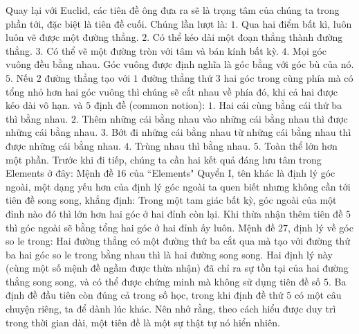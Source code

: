 \begin{multicols}{2}
	\vskip 0.1cm
	Quay lại với Euclid, các tiên đề ông đưa ra sẽ là trọng tâm của chúng ta trong phần tới, đặc biệt là tiên đề cuối. Chúng lần lượt là:
	\vskip 0.1cm
	$1.$ Qua hai điểm bất kì, luôn luôn vẽ được một đường thẳng.
	\vskip 0.1cm
	$2.$ Có thể kéo dài một đoạn thẳng thành đường thẳng.
	\vskip 0.1cm
	$3.$ Có thể vẽ một đường tròn với tâm và bán kính bất kỳ.
	\vskip 0.1cm
	$4.$ Mọi góc vuông đều bằng nhau.
	\vskip 0.1cm
	Góc vuông được định nghĩa là góc bằng với góc bù của nó.
	\vskip 0.1cm
	$5.$ Nếu $2$ đường thẳng tạo với $1$ đường thẳng thứ $3$ hai góc trong cùng phía mà có tổng nhỏ hơn hai góc vuông thì chúng sẽ cắt nhau về phía đó, khi cả hai được kéo dài vô hạn.
	\vskip 0.1cm
	và $5$ định đề (common notion):
	\vskip 0.1cm
	$1.$ Hai cái cùng bằng cái thứ ba thì bằng nhau. 
	\vskip 0.1cm
	$2.$ Thêm những cái bằng nhau vào những cái bằng nhau thì được những cái bằng nhau.
	\vskip 0.1cm
	$3.$ Bớt đi những cái bằng nhau từ những cái bằng nhau thì được những cái bằng nhau.
	\vskip 0.1cm
	$4.$ Trùng nhau thì bằng nhau.
	\vskip 0.1cm
	$5.$ Toàn thể lớn hơn một phần.
	\vskip 0.1cm
	Trước khi đi tiếp, chúng ta cần hai kết quả đáng lưu tâm trong Elements ở đây:
	\vskip 0.1cm
	Mệnh đề $16$ của ``Elements" Quyển I, tên khác là định lý góc ngoài, một dạng yếu hơn của định lý góc ngoài ta quen biết nhưng không cần tới tiên đề song song, khẳng định: 
	\vskip 0.1cm
	Trong một tam giác bất kỳ, góc ngoài của một đỉnh nào đó thì lớn hơn hai góc ở hai đỉnh còn lại.
	\vskip 0.1cm
	Khi thừa nhận thêm tiên đề $5$ thì góc ngoài sẽ bằng tổng hai góc ở hai đỉnh ấy luôn.
	\vskip 0.1cm
	Mệnh đề $27$, định lý về góc so le trong: 
	\vskip 0.1cm
	Hai đường thẳng có một đường thứ ba cắt qua mà tạo với đường thứ ba hai góc so le trong bằng nhau thì là hai đường song song.
	\vskip 0.1cm
	Hai định lý này (cùng một số mệnh đề ngầm được thừa nhận) đã chỉ ra sự tồn tại của hai đường thẳng song song, và có thể được chứng minh mà không sử dụng tiên đề số $5$. Ba định đề đầu tiên còn đúng cả trong số học, trong khi định đề thứ $5$ có một câu chuyện riêng, ta để dành lúc khác. Nên nhớ rằng, theo cách hiểu được duy trì trong thời gian dài, một tiên đề là một sự thật tự nó hiển nhiên. 
	\vskip 0.1cm

\end{multicols}
